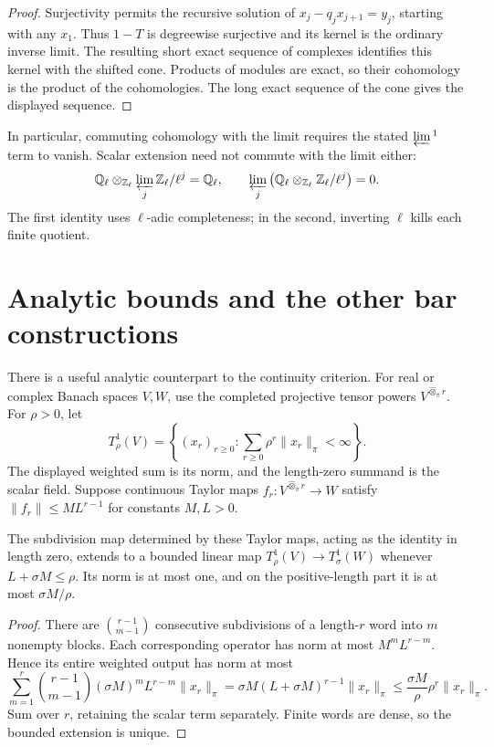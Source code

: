 \begin{proof}
Surjectivity permits the recursive solution of
\(x_j-q_jx_{j+1}=y_j\), starting with any \(x_1\). Thus
\(1-T\) is degreewise surjective and its kernel is the ordinary
inverse limit. The resulting short exact sequence of complexes
identifies this kernel with the shifted cone. Products of modules
are exact, so their cohomology is the product of the cohomologies.
The long exact sequence of the cone gives the displayed sequence.
\end{proof}

In particular, commuting cohomology with the limit requires the
stated \(\varprojlim{}^1\) term to vanish. Scalar extension need
not commute with the limit either:
\[
 \mathbb Q_\ell\otimes_{\mathbb Z_\ell}
       \varprojlim_j\mathbb Z_\ell/\ell^j=\mathbb Q_\ell,
 \qquad
 \varprojlim_j\left(
       \mathbb Q_\ell\otimes_{\mathbb Z_\ell}
                    \mathbb Z_\ell/\ell^j\right)=0.
\]
The first identity uses \(\ell\)-adic completeness; in the
second, inverting \(\ell\) kills each finite quotient.

\section{Analytic bounds and the other bar constructions}
\label{v4-sec:bar-analytic-transverse}

There is a useful analytic counterpart to the continuity criterion.
For real or complex Banach spaces \(V,W\), use the completed
projective tensor powers \(V^{\widehat\otimes_\pi r}\). For
\(\rho>0\), let
\[
 T^1_\rho(V)=
 \left\{(x_r)_{r\geq0}:
          \sum_{r\geq0}\rho^r\|x_r\|_\pi<\infty\right\}.
\]
The displayed weighted sum is its norm, and the length-zero
summand is the scalar field. Suppose continuous
Taylor maps \(f_r:V^{\widehat\otimes_\pi r}\to W\) satisfy
\(\|f_r\|\leq ML^{r-1}\) for constants \(M,L>0\).

\begin{proposition}\label{v4-prop:bar-analytic-bound}
The subdivision map determined by these Taylor maps, acting as
the identity in length zero, extends to a bounded linear map
\(T^1_\rho(V)\to T^1_\sigma(W)\) whenever
\(L+\sigma M\leq\rho\). Its norm is at most one, and on the
positive-length part it is at most \(\sigma M/\rho\).
\end{proposition}

\begin{proof}
There are \(\binom{r-1}{m-1}\) consecutive subdivisions of a
length-\(r\) word into \(m\) nonempty blocks. Each corresponding
operator has norm at most \(M^mL^{r-m}\). Hence its entire
weighted output has norm at most
\[
 \sum_{m=1}^r\binom{r-1}{m-1}
       (\sigma M)^mL^{r-m}\|x_r\|_\pi
   =\sigma M(L+\sigma M)^{r-1}\|x_r\|_\pi
   \leq\frac{\sigma M}{\rho}\rho^r\|x_r\|_\pi.
\]
Sum over \(r\), retaining the scalar term separately. Finite
words are dense, so the bounded extension is unique.
\end{proof}

